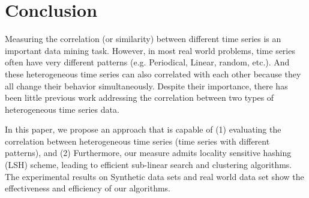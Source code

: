 \section{Conclusion}

Measuring the correlation (or similarity) between different time series is an important data mining task. 
However, in most real world problems, time series often have very different patterns (e.g. Periodical, Linear, random, etc.). 
And these heterogeneous time series can also correlated with each other because they all change their behavior simultaneously.
Despite their importance, there has been little previous work addressing the correlation between two types of heterogeneous time series data.

In this paper, we propose an approach that is capable of (1) evaluating the correlation between heterogeneous time series (time series with different patterns), and (2)  Furthermore, our measure admits locality sensitive hashing (LSH) scheme, leading to efficient sub-linear search and clustering algorithms.
The experimental results on Synthetic data sets and real world data set show
the effectiveness and efficiency of our algorithms.